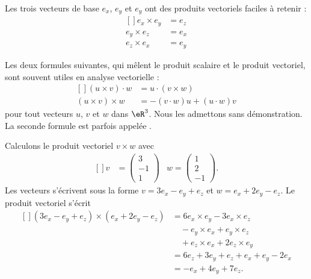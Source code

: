 Les trois vecteurs de base $e_x$, $e_y$ et $e_y$ ont des produits vectoriels faciles à retenir :
\begin{equation}
    \begin{aligned}[]
        e_x\times e_y&=e_z\\
        e_y\times e_z&=e_x\\
        e_z\times e_x&=e_y
    \end{aligned}
\end{equation}

Les deux formules suivantes, qui mêlent le produit scalaire et le produit vectoriel, sont souvent utiles en analyse vectorielle :
\begin{equation}
	\begin{aligned}[]
		(u\times v)\cdot w&=u\cdot(v\times w)\\
		(u\times v)\times w&=-(v\cdot w)u+(u\cdot w)v		\label{EqFormExpluxxx}
	\end{aligned}
\end{equation}
pour tout vecteurs $u$, $v$ et $w$ dans $\eR^3$. Nous les admettons sans démonstration. La seconde formule est parfois appelée .

\begin{example}
    Calculons le produit vectoriel $v\times w$ avec
    \begin{equation}
        \begin{aligned}[]
            v&=\begin{pmatrix}
                3    \\
                -1    \\
                1
            \end{pmatrix}&w=\begin{pmatrix}
                1    \\
                2    \\
                -1
            \end{pmatrix}.
        \end{aligned}
    \end{equation}
    Les vecteurs s'écrivent sous la forme $v=3e_x-e_y+e_z$ et $w=e_x+2e_y-e_z$. Le produit vectoriel s'écrit
    \begin{equation}
        \begin{aligned}[]
            (3e_x-e_y+e_z)\times (e_x+2e_y-e_z)&=6e_x\times e_y-3e_x\times e_z\\
                                &\quad -e_y\times e_x + e_y\times e_z\\
                                &\quad + e_z\times e_x + 2e_z\times e_y\\
                                &=6e_z+3e_y+e_z+e_x+e_y-2e_x\\
                                &=-e_x+4e_y+7e_z.
        \end{aligned}
    \end{equation}
\end{example}

